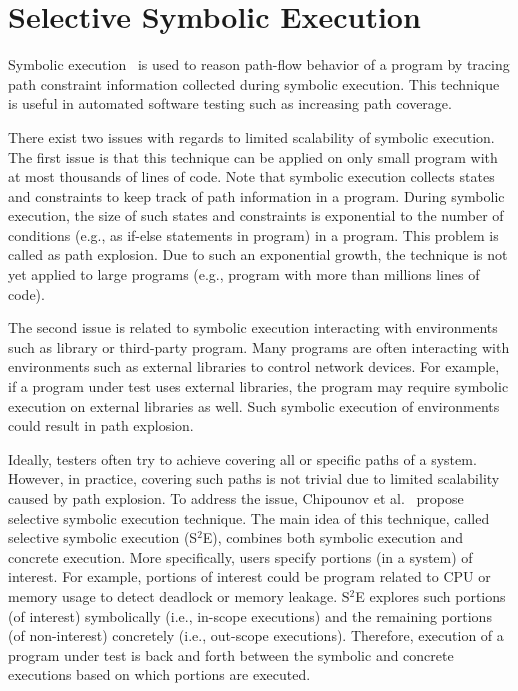 \section{Selective Symbolic Execution}

Symbolic execution~\cite{symbolic} is used to reason path-flow behavior of a program by tracing path constraint information collected during symbolic execution. This technique is useful in automated software testing such as increasing path coverage.

There exist two issues with regards to limited scalability of symbolic execution. The first issue is that this technique can be applied on only small program with at most thousands of lines of code. Note that symbolic execution collects states and constraints to keep track of path information in a program. During symbolic execution, the size of such states and constraints is exponential to the number of conditions (e.g., as if-else statements in program) in a program. This problem is called as path explosion. Due to such an exponential growth, the technique is not yet applied to large programs (e.g., program with more than millions lines of code).

The second issue is related to symbolic execution interacting with environments such as library or third-party program. Many programs are often interacting with environments such as external libraries to control network devices. For example, if a program under test uses external libraries, the program may require symbolic execution on external libraries as well. Such symbolic execution of environments could result in path explosion.

Ideally, testers often try to achieve covering all or specific paths of a system. However, in practice, covering such paths is not trivial due to limited scalability caused by path explosion. To address the issue, Chipounov et al.~\cite{selective} propose selective symbolic execution technique. The main idea of this technique, called selective symbolic execution (S$^2$E), combines both symbolic execution and concrete execution. More specifically, users specify portions (in a system) of interest. For example, portions of interest could be program related to CPU or memory usage to detect deadlock or memory leakage. S$^2$E explores such portions (of interest) symbolically (i.e., in-scope executions) and the remaining portions (of non-interest) concretely (i.e., out-scope executions). Therefore, execution of a program under test is back and forth between the symbolic and concrete executions based on which portions are executed.

